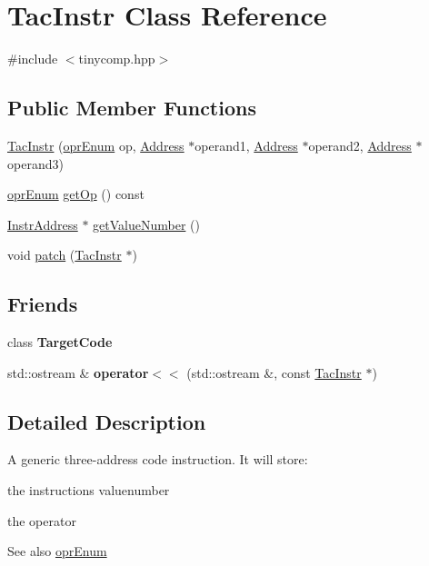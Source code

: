 \hypertarget{class_tac_instr}{}\section{Tac\+Instr Class Reference}
\label{class_tac_instr}


{\ttfamily \#include $<$tinycomp.\+hpp$>$}

\subsection*{Public Member Functions}
\begin{DoxyCompactItemize}
\item 
\hyperlink{class_tac_instr_ab607b7ce5c1f93748859e801eb6583a1}{Tac\+Instr} (\hyperlink{tinycomp_8h_a042125b56c7cb23c8c11e3aeb8de20cc}{opr\+Enum} op, \hyperlink{class_address}{Address} $\ast$operand1, \hyperlink{class_address}{Address} $\ast$operand2, \hyperlink{class_address}{Address} $\ast$operand3)
\item 
\hyperlink{tinycomp_8h_a042125b56c7cb23c8c11e3aeb8de20cc}{opr\+Enum} \hyperlink{class_tac_instr_afdf3f5b13808a3e8a73cfb8475f770e3}{get\+Op} () const 
\item 
\hyperlink{class_instr_address}{Instr\+Address} $\ast$ \hyperlink{class_tac_instr_ac4d3bc015e93338b0bba8af680576e30}{get\+Value\+Number} ()
\item 
void \hyperlink{class_tac_instr_a6e6955830a1420096bfc53be040675e9}{patch} (\hyperlink{class_tac_instr}{Tac\+Instr} $\ast$)
\end{DoxyCompactItemize}
\subsection*{Friends}
\begin{DoxyCompactItemize}
\item 
class {\bfseries Target\+Code}\hypertarget{class_tac_instr_a4a2d7047235cb01678f9f261600e3865}{}\label{class_tac_instr_a4a2d7047235cb01678f9f261600e3865}

\item 
std\+::ostream \& {\bfseries operator$<$$<$} (std\+::ostream \&, const \hyperlink{class_tac_instr}{Tac\+Instr} $\ast$)\hypertarget{class_tac_instr_a4497e4e38cff2ae7a1d600ee5e79bf87}{}\label{class_tac_instr_a4497e4e38cff2ae7a1d600ee5e79bf87}

\end{DoxyCompactItemize}


\subsection{Detailed Description}
A generic three-\/address code instruction. It will store\+:
\begin{DoxyItemize}
\item the instruction\textquotesingle{}s valuenumber
\item the operator \begin{DoxySeeAlso}{See also}
\hyperlink{tinycomp_8h_a042125b56c7cb23c8c11e3aeb8de20cc}{opr\+Enum} 
\end{DoxySeeAlso}

\end{DoxyItemize}

